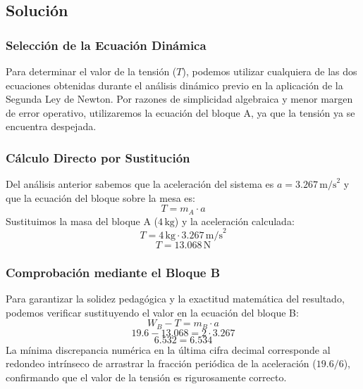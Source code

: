 \documentclass[12pt]{article}
\begin{document}
\subsection*{Solución}

\subsubsection*{Selección de la Ecuación Dinámica}
Para determinar el valor de la tensión ($T$), podemos utilizar cualquiera de las dos ecuaciones obtenidas durante el análisis dinámico previo en la aplicación de la Segunda Ley de Newton. Por razones de simplicidad algebraica y menor margen de error operativo, utilizaremos la ecuación del bloque A, ya que la tensión ya se encuentra despejada.

\subsubsection*{Cálculo Directo por Sustitución}
Del análisis anterior sabemos que la aceleración del sistema es $a = 3.267 \, \text{m/s}^2$ y que la ecuación del bloque sobre la mesa es:
\begin{equation}
    T = m_A \cdot a
\end{equation}
Sustituimos la masa del bloque A ($4 \, \text{kg}$) y la aceleración calculada:
\begin{equation}
    T = 4 \, \text{kg} \cdot 3.267 \, \text{m/s}^2
\end{equation}
\begin{equation}
    T = 13.068 \, \text{N}
\end{equation}

\subsubsection*{Comprobación mediante el Bloque B}
Para garantizar la solidez pedagógica y la exactitud matemática del resultado, podemos verificar sustituyendo el valor en la ecuación del bloque B:
\begin{equation}
    W_B - T = m_B \cdot a
\end{equation}
\begin{equation}
    19.6 - 13.068 = 2 \cdot 3.267
\end{equation}
\begin{equation}
    6.532 = 6.534
\end{equation}
La mínima discrepancia numérica en la última cifra decimal corresponde al redondeo intrínseco de arrastrar la fracción periódica de la aceleración ($19.6/6$), confirmando que el valor de la tensión es rigurosamente correcto.
\end{document}
